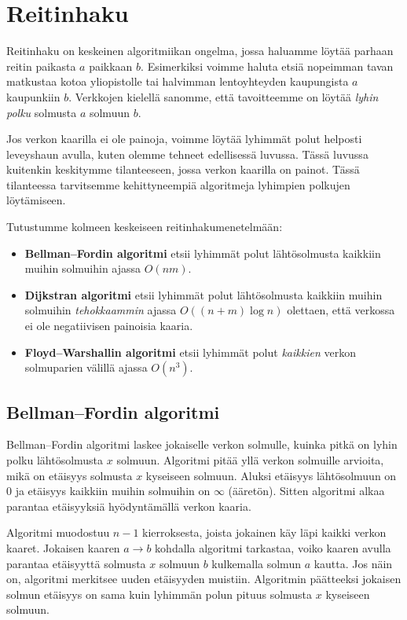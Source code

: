 \chapter{Reitinhaku}

Reitinhaku on keskeinen algoritmiikan ongelma, jossa haluamme
löytää parhaan reitin paikasta $a$ paikkaan $b$.
Esimerkiksi voimme haluta etsiä nopeimman tavan
matkustaa kotoa yliopistolle
tai halvimman lentoyhteyden kaupungista $a$
kaupunkiin $b$.
Verkkojen kielellä sanomme, että tavoitteemme on löytää \emph{lyhin polku}
solmusta $a$ solmuun $b$.

Jos verkon kaarilla ei ole painoja,
voimme löytää lyhimmät polut helposti leveyshaun avulla,
kuten olemme tehneet edellisessä luvussa.
Tässä luvussa kuitenkin keskitymme tilanteeseen,
jossa verkon kaarilla on painot.
Tässä tilanteessa tarvitsemme kehittyneempiä algoritmeja
lyhimpien polkujen löytämiseen.

Tutustumme kolmeen keskeiseen reitinhakumenetelmään:

\begin{itemize}
\item \textbf{Bellman–Fordin algoritmi} etsii lyhimmät polut
lähtösolmusta kaikkiin muihin solmuihin ajassa $O(nm)$.
\item \textbf{Dijkstran algoritmi} etsii lyhimmät polut
lähtösolmusta kaikkiin muihin solmuihin \emph{tehokkaammin} ajassa $O((n+m) \log n)$
olettaen, että verkossa ei ole negatiivisen painoisia kaaria.
\item \textbf{Floyd–Warshallin algoritmi} etsii lyhimmät polut
\emph{kaikkien} verkon solmuparien välillä ajassa $O(n^3)$.
\end{itemize}

\section{Bellman–Fordin algoritmi}

Bellman–Fordin algoritmi laskee jokaiselle verkon solmulle,
kuinka pitkä on lyhin polku lähtösolmusta $x$ solmuun.
Algoritmi pitää yllä verkon solmuille arvioita,
mikä on etäisyys solmusta $x$ kyseiseen solmuun.
Aluksi etäisyys lähtösolmuun on 0 ja etäisyys kaikkiin muihin
solmuihin on $\infty$ (ääretön).
Sitten algoritmi alkaa parantaa etäisyyksiä
hyödyntämällä verkon kaaria.

Algoritmi muodostuu $n-1$ kierroksesta, joista jokainen käy läpi
kaikki verkon kaaret.
Jokaisen kaaren $a \rightarrow b$ kohdalla algoritmi tarkastaa,
voiko kaaren avulla parantaa etäisyyttä solmusta $x$ solmuun $b$
kulkemalla solmun $a$ kautta.
Jos näin on, algoritmi merkitsee uuden etäisyyden muistiin.
Algoritmin päätteeksi jokaisen solmun etäisyys on sama kuin
lyhimmän polun pituus solmusta $x$ kyseiseen solmuun.

